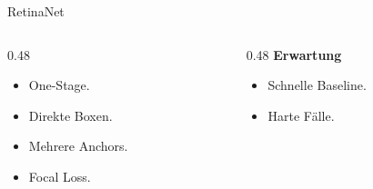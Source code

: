 \begin{frame}{RetinaNet}
\small
\begin{columns}[T,onlytextwidth]
\begin{column}{0.48\textwidth}
\begin{itemize}
    \item One-Stage.
    \item Direkte Boxen.
    \item Mehrere Anchors.
    \item Focal Loss.
\end{itemize}
\end{column}
\begin{column}{0.48\textwidth}
\textbf{Erwartung}
\begin{itemize}
    \item Schnelle Baseline.
    \item Harte Fälle.
\end{itemize}
\end{column}
\end{columns}
\end{frame}
